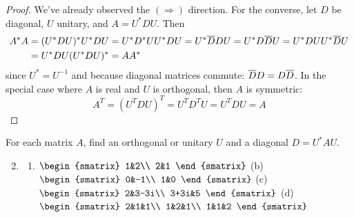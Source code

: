 \begin{proof}
	We've already observed the $(\Rightarrow)$ direction.\smallbreak
	For the converse, let $D$ be diagonal, $U$ unitary, and $A=U^*DU$. Then
	\begin{align*}
		A^*A
		&=(U^*DU)^*U^*DU =U^*D^*UU^*DU =U^*\overline{D}DU
		=U^*D\overline{D}U =U^*DUU^*\overline{D}U\\
		&=U^*DU(U^*DU)^* =AA^*
	\end{align*}
	since $U^*=U^{-1}$ and because diagonal matrices commute: $\overline{D}D=D\overline{D}$.\smallbreak
	In the special case where $A$ is real and $U$ is orthogonal, then $A$ is symmetric:
	\[
		A^T =(U^TDU)^T =U^TD^TU =U^TDU =A 
		\tag*{\qedhere}
	\]
\end{proof}


\pagebreak[3]


\begin{exercises}
	\exstart For each matrix $A$, find an orthogonal or unitary $U$ and a diagonal $D=U^*AU$.

	\begin{enumerate}\setcounter{enumi}{1}\label{exs:orthequiv1}
	  \item[]\begin{enumerate}
	    \item $\begin{smatrix}
	    	1&2\\
	    	2&1
	    \end{smatrix}$
	    \qquad
	    (b)\ \ $\begin{smatrix}
	    	0&-1\\
	    	1&0
	    \end{smatrix}$
	    \qquad
	    (c)\ \ $\begin{smatrix}
	    	2&3-3i\\
	    	3+3i&5
	    \end{smatrix}$
	    \qquad
	    (d)\ \ $\begin{smatrix}
	    	2&1&1\\
	    	1&2&1\\
	    	1&1&2
	    \end{smatrix}$
	  \end{enumerate}
	  

\end{enumerate}
\end{exercises}
